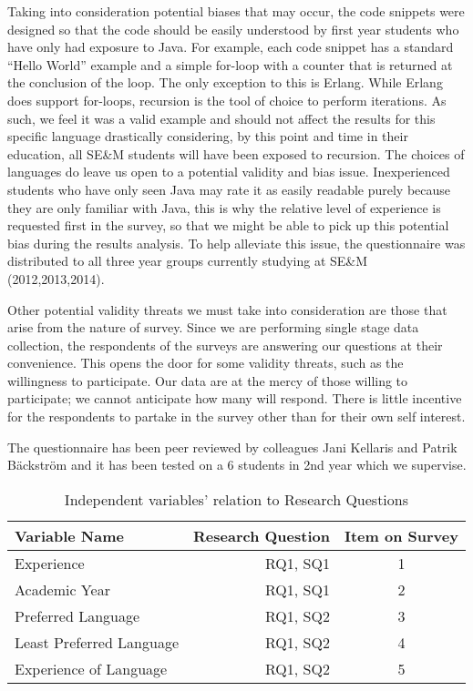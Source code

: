 \documentclass[times, 10pt,twocolumn]{IEEEtran}
\begin{document}
Taking into consideration potential biases that may occur, the code snippets were designed so that the code should be easily understood by first year students who have only had exposure to Java. For example, each code snippet has a standard ``Hello World'' example and a simple for-loop with a counter that is returned at the conclusion of the loop. The only exception to this is Erlang. While Erlang does support for-loops, recursion is the tool of choice to perform iterations. As such, we feel it was a valid example and should not affect the results for this specific language drastically considering, by this point and time in their education, all SE\&M students will have been exposed to recursion. The choices of languages do leave us open to a potential validity and bias issue. Inexperienced students who have only seen Java may rate it as easily readable purely because they are only familiar with Java, this is why the relative level of experience is requested first in the survey, so that we might be able to pick up this potential bias during the results analysis. To help alleviate this issue, the questionnaire was distributed to all three year groups currently studying at SE\&M (2012,2013,2014).
\newline

Other potential validity threats we must take into consideration are those that arise from the nature of survey. Since we are performing single stage data collection, the respondents of the surveys are answering our questions at their convenience. This opens the door for some validity threats, such as the willingness to participate. Our data are at the mercy of those willing to participate; we cannot anticipate how many will respond. There is little incentive for the respondents to partake in the survey other than for their own self interest. 
\newline

The questionnaire has been peer reviewed by colleagues Jani Kellaris and Patrik Bäckström and it has been tested on a 6 students in 2nd year which we supervise. 

\begin{table}[ht]
  \centering
  \begin{tabular}{| l | r | c |}
    \hline
    \textbf{Variable Name} & \textbf{Research Question} & \textbf{Item on Survey} \\ \hline
    Experience & RQ1, SQ1 & 1 \\ \hline
    Academic Year & RQ1, SQ1 & 2 \\ \hline
    Preferred Language & RQ1, SQ2 & 3 \\ \hline
    Least Preferred Language & RQ1, SQ2& 4 \\  \hline
    Experience of Language & RQ1, SQ2 & 5 \\ 
    \hline
  \end{tabular}
  \caption{Independent variables' relation to Research Questions}
\end{table}
\end{document}
